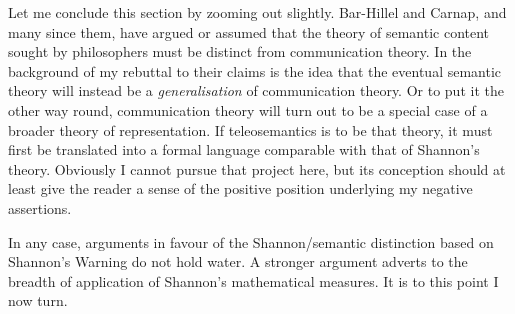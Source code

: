 Let me conclude this section by zooming out slightly.
Bar-Hillel and Carnap, and many since them, have argued or assumed that the theory of semantic content sought by philosophers must be distinct from communication theory.
In the background of my rebuttal to their claims is the idea that the eventual semantic theory will instead be a \textit{generalisation} of communication theory.
Or to put it the other way round, communication theory will turn out to be a special case of a broader theory of representation.
If teleosemantics is to be that theory, it must first be translated into a formal language comparable with that of Shannon's theory.
Obviously I cannot pursue that project here, but its conception should at least give the reader a sense of the positive position underlying my negative assertions.

In any case, arguments in favour of the Shannon/semantic distinction based on {\sc Shannon's Warning} do not hold water.
A stronger argument adverts to the breadth of application of Shannon's mathematical measures.
It is to this point I now turn.





